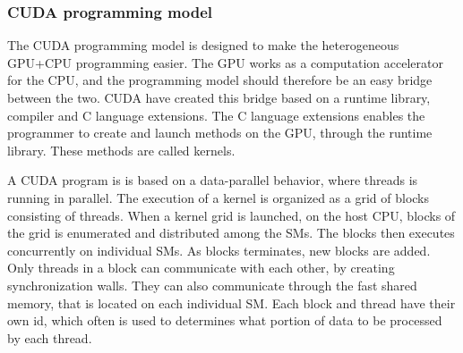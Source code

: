 
\subsubsection{CUDA programming model} %
\label{ssub:cuda_programming_model}

The CUDA programming model is designed to make the heterogeneous GPU+CPU programming easier. The GPU works as a computation accelerator for the CPU, and the programming model should therefore be an easy bridge between the two. CUDA have created this bridge based on a runtime library, compiler and C language extensions. The C language extensions enables the programmer to create and launch methods on the GPU, through the runtime library. These methods are called kernels.

A CUDA program is is based on a data-parallel behavior, where threads is running in parallel. The execution of a kernel is organized as a grid of blocks consisting of threads. When a kernel grid is launched, on the host CPU, blocks of the grid is enumerated and distributed among the SMs. The blocks then executes concurrently on individual SMs. As blocks terminates, new blocks are added. Only threads in a block can communicate with each other, by creating synchronization walls. They can also communicate through the fast shared memory, that is located on each individual SM. Each block and thread have their own id, which often is used to determines what portion of data to be processed by each thread.

